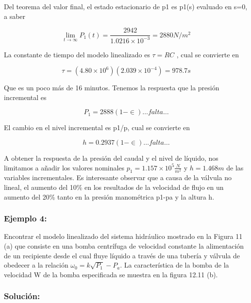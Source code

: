 \documentclass[a4paper,12pt,twoside]{proyectotanquesecci}
\begin{document}
Del teorema del valor final, el estado estacionario de p1 es p1(s) evaluado en s=0, a saber

\begin{equation}
\lim _{t\rightarrow \infty }P_{1}\left( t\right) =\frac {2942}{1.0216\times 10^{-3}}=2880N/m^{2}
\end{equation}

La constante de tiempo del modelo linealizado es $\tau = RC$ , cual se convierte en 

\begin{equation}
\tau =\left( 4.80\times 10^{6}\right) \left( 2.039\times 10^{-4}\right) =978.7s
\end{equation}

Que es un poco más de 16 minutos. Tenemos la respuesta que la  presión incremental es

\begin{equation}
P_{1}=2888\left( 1-\in \right) \ldots falta\ldots
\end{equation}

El cambio en el nivel incremental es p1/p, cual se convierte en 

\begin{equation}
h=0.2937\left( 1-\in \right) \ldots falta\ldots 
\end{equation}

A obtener la respuesta de la presión del caudal y el nivel de líquido, nos limitamos a añadir los valores nominales $p_{1}=1.157\times 10^{5}\frac {N}{m^{2}}$ y $h=1.468m$  de las variables incrementales. Es interesante observar que a causa de la válvula no lineal, el aumento del 10\% en los resultados de la velocidad de flujo en un aumento del 20\% tanto en la presión manométrica p1-pa y la altura h.

\subsubsection{Ejemplo 4:}

Encontrar el modelo linealizado del sistema hidráulico mostrado en la Figura 11 (a) que consiste en una bomba centrífuga de velocidad constante la alimentación de un recipiente desde el cual fluye líquido a través de una tubería y válvula de obedecer a la relación $\omega _{0}=k\sqrt {P_{1}}-P_{a}$. La característica de la bomba de la velocidad W de la bomba especificada se muestra en la figura 12.11 (b). \\

\subsubsection{Solución:}
\end{document}

